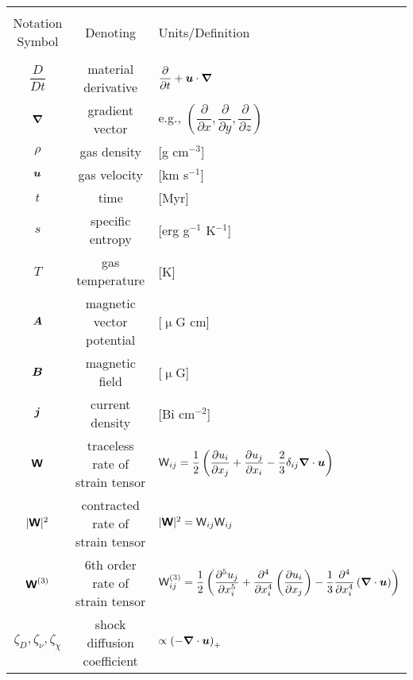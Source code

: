 \documentclass[preprint2]{aastex63}
\newcommand{\vect}[1]{{{\mbox{\boldmath $#1$}}}}%
\newcommand{\mathbfss}[1]{\textbf{\textsf{#1}}}
\begin{document}
\begin{table*}[h]
\begin{tabular}{ccl}
\hline\hline\\
{Notation Symbol} & {Denoting} & {Units/Definition}\\\hline\\
 $\dfrac{D}{Dt}$ & material derivative & $\dfrac{\partial }{\partial t}+\vect{u}\cdot \vect\nabla$ \\
 $\vect\nabla$ & gradient vector & e.g., $\left(\dfrac{\partial }{\partial x},\dfrac{\partial }{\partial y},\dfrac{\partial }{\partial z}\right)$ \\
 $\rho$ & gas density & [g cm$^{-3}$]  \\
 $\vect u$ & gas velocity & [km s$^{-1}$] \\
 $t$ & time & [Myr] \\
 $s$ & specific entropy & [erg g$^{-1}$ K$^{-1}$] \\
 $T$ & gas temperature & [K] \\
 $\vect A$ & magnetic vector potential & [$\upmu$G cm] \\
 $\vect B$ & magnetic field & [$\upmu$G] \\
 $\vect j$ & current density & [Bi cm$^{-2}$] \\
 $\mathbfss W$ & traceless rate of strain tensor &
   ${\mathsf W}_{ij} = \dfrac{1}{2}\left(\dfrac{\partial u_i}{\partial x_j}
                  + \dfrac{\partial u_j}{\partial x_i}
                  -\dfrac{2}{3} \delta_{ij}\vect\nabla\cdot \vect u\right)$ \\
 $|\mathbfss W|^2$ & contracted rate of strain tensor &
   $|\mathbfss W|^2={\mathsf W}_{ij}{\mathsf W}_{ij}$\\
 $\mathbfss W^{(3)}$ & 6th order rate of strain tensor &
   ${\mathsf W}_{ij}^{(3)} = \dfrac{1}{2}\left(\dfrac{\partial^5 u_j}{\partial x_i^5}
                  + \dfrac{\partial^4}{\partial x_i^4}\left(\dfrac{\partial u_i}{\partial x_j}\right)
                  -\dfrac{1}{3}\dfrac{\partial^4}{\partial x_i^4}\left(\vect\nabla\cdot \vect u\right)\right)$ \\
 $\zeta_{D},\zeta_{\nu},\zeta_{\chi}$ & shock diffusion coefficient& $\propto \left(-\vect\nabla\cdot\vect u\right)_+$\\

\end{tabular}
\end{table*}
\end{document}
